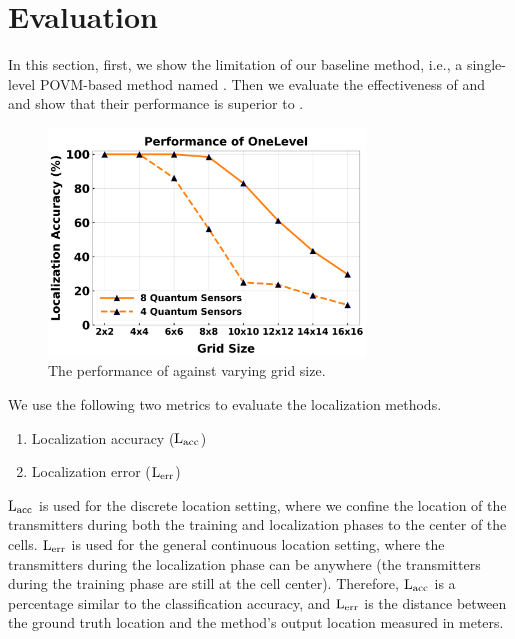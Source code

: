 \section{Evaluation}
\label{evaluation}
\label{sec:quantum_eval}


In this section, first, we show the limitation of our baseline method, i.e., a single-level POVM-based method named \povmone.
Then we evaluate the effectiveness of \povm and \povmpro and show that their performance is superior to \povmone. 

\begin{figure}[t]
    \centering
    \includegraphics[width=0.75\textwidth]{chapters/qce/figures/onelevel-varygrid.png}
    \caption{The performance of \povmone against varying grid size.}
    \label{fig:povmloc-onelevel}
\end{figure}

 We use the following two metrics to evaluate the localization methods.
\begin{enumerate}
    \item Localization accuracy ($\mathrm{L_{acc}}$)
    \item Localization error ($\mathrm{L_{err}}$)
\end{enumerate}
$\mathrm{L_{acc}}$ is used for the discrete location setting, where we confine the location of the transmitters during both the training and localization phases to the center of the cells.
$\mathrm{L_{err}}$ is used for the general continuous location setting, where the transmitters during the localization phase can be anywhere (the transmitters during the training phase are still at the cell center).
Therefore, $\mathrm{L_{acc}}$ is a percentage similar to the classification accuracy, and $\mathrm{L_{err}}$ is the distance between the ground truth location and the method's output location measured in meters.

